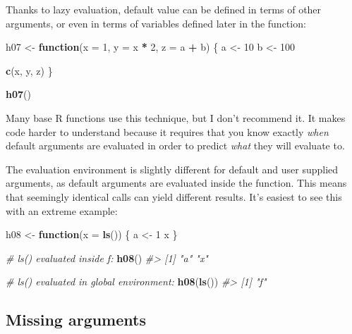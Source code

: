 \documentclass[]{book}
\newenvironment{Shaded}{\begin{snugshade}}{\end{snugshade}}
\newcommand{\KeywordTok}[1]{\textcolor[rgb]{0.13,0.29,0.53}{\textbf{#1}}}
\newcommand{\DataTypeTok}[1]{\textcolor[rgb]{0.13,0.29,0.53}{#1}}
\newcommand{\DecValTok}[1]{\textcolor[rgb]{0.00,0.00,0.81}{#1}}
\newcommand{\StringTok}[1]{\textcolor[rgb]{0.31,0.60,0.02}{#1}}
\newcommand{\CommentTok}[1]{\textcolor[rgb]{0.56,0.35,0.01}{\textit{#1}}}
\newcommand{\ControlFlowTok}[1]{\textcolor[rgb]{0.13,0.29,0.53}{\textbf{#1}}}
\newcommand{\OperatorTok}[1]{\textcolor[rgb]{0.81,0.36,0.00}{\textbf{#1}}}
\newcommand{\NormalTok}[1]{#1}
\theoremstyle{definition}
\theoremstyle{definition}
\theoremstyle{definition}
\theoremstyle{remark}
\begin{document}
Thanks to lazy evaluation, default value can be defined in terms of
other arguments, or even in terms of variables defined later in the
function:

\begin{Shaded}
\begin{Highlighting}[]
\NormalTok{h07 <-}\StringTok{ }\ControlFlowTok{function}\NormalTok{(}\DataTypeTok{x =} \DecValTok{1}\NormalTok{, }\DataTypeTok{y =}\NormalTok{ x }\OperatorTok{*}\StringTok{ }\DecValTok{2}\NormalTok{, }\DataTypeTok{z =}\NormalTok{ a }\OperatorTok{+}\StringTok{ }\NormalTok{b) \{}
\NormalTok{  a <-}\StringTok{ }\DecValTok{10}
\NormalTok{  b <-}\StringTok{ }\DecValTok{100}
  
  \KeywordTok{c}\NormalTok{(x, y, z)}
\NormalTok{\}}

\KeywordTok{h07}\NormalTok{()}
\end{Highlighting}
\end{Shaded}

Many base R functions use this technique, but I don't recommend it. It
makes code harder to understand because it requires that you know
exactly \emph{when} default arguments are evaluated in order to predict
\emph{what} they will evaluate to.

The evaluation environment is slightly different for default and user
supplied arguments, as default arguments are evaluated inside the
function. This means that seemingly identical calls can yield different
results. It's easiest to see this with an extreme example:

\begin{Shaded}
\begin{Highlighting}[]
\NormalTok{h08 <-}\StringTok{ }\ControlFlowTok{function}\NormalTok{(}\DataTypeTok{x =} \KeywordTok{ls}\NormalTok{()) \{}
\NormalTok{  a <-}\StringTok{ }\DecValTok{1}
\NormalTok{  x}
\NormalTok{\}}

\CommentTok{# ls() evaluated inside f:}
\KeywordTok{h08}\NormalTok{()}
\CommentTok{#> [1] "a" "x"}

\CommentTok{# ls() evaluated in global environment:}
\KeywordTok{h08}\NormalTok{(}\KeywordTok{ls}\NormalTok{())}
\CommentTok{#> [1] "f"}
\end{Highlighting}
\end{Shaded}

\subsection{Missing arguments}\label{missing-arguments}
\end{document}
